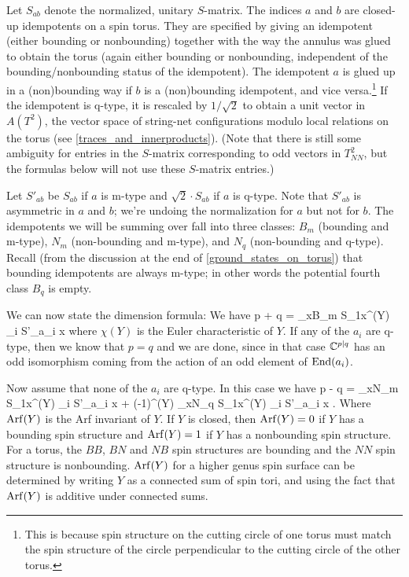 Let $S_{ab}$ denote the normalized, unitary $S$-matrix.
The indices $a$ and $b$ are closed-up idempotents on a spin torus.
They are specified by giving an idempotent (either bounding or nonbounding) together with
the way the annulus was glued 
to obtain the torus (again either bounding or nonbounding,
independent of the bounding/nonbounding status of the idempotent).
The idempotent $a$ is glued up in a (non)bounding way if $b$ is a (non)bounding idempotent, 
and vice versa.\footnote{
This is because spin structure on the cutting circle of one torus must
match the spin structure of the circle perpendicular to the cutting circle of the other torus.
}
If the idempotent is q-type, it is rescaled by $1/\sqrt 2$ to obtain a unit vector in $A(T^2)$, 
the vector space of string-net configurations modulo local relations on the torus
(see \ref{traces_and_innerproducts}).
(Note that there is still some ambiguity for entries in the $S$-matrix corresponding
to odd vectors in $T^2_{NN}$, but the formulas below will not use these $S$-matrix entries.)

Let $S'_{ab}$ be $S_{ab}$ if $a$ is m-type and $\sqrt 2 \cdot S_{ab}$ if $a$ is q-type.
Note that $S'_{ab}$ is asymmetric in $a$ and $b$;
we're undoing the normalization for $a$ but not for $b$.
The idempotents we will be summing over fall into three classes:
$B_m$ (bounding and m-type), $N_m$ (non-bounding and m-type), and $N_q$ (non-bounding and q-type).
Recall 
(from the discussion at the end of \ref{ground_states_on_torus}) 
that bounding idempotents are always m-type; in other words the potential fourth class $B_q$ is empty.


\medskip

We can now state the dimension formula:
We have
\be
	p + q = \sum_{x\in B_m} {S_{1x}}^{\chi(Y)} {\textstyle \prod_i} S'_{a_i x} 
	\label{PplusQ}
\ee
where $\chi(Y)$ is the Euler characteristic of $Y$.
If any of the $a_i$ are q-type, then we know that $p=q$ and we are done, since in that case 
$\mathbb{C}^{p|q}$ has an odd isomorphism coming from the action of an odd element of $\text{End}(a_i)$.

Now assume that none of the $a_i$ are q-type.
In this case we have
\be
	p - q = \sum_{x\in N_m} {S_{1x}}^{\chi(Y)} {\textstyle \prod_i} S'_{a_i x}
			\;\;+\;\; (-1)^{\Arf(Y)} \sum_{x\in N_q} {S_{1x}}^{\chi(Y)} {\textstyle \prod_i} S'_{a_i x} .
			\label{PminusQ}
\ee
Where $\operatorname{Arf}(Y)$ is the Arf invariant of $Y$.
If $Y$ is closed, then $\operatorname{Arf}(Y) = 0$ if $Y$ has a bounding spin structure and 
$\operatorname{Arf}(Y) = 1$ if $Y$ has a nonbounding spin structure.
For a torus, the $BB$, $BN$ and $NB$ spin structures are bounding and the $NN$ spin structure is nonbounding.
$\operatorname{Arf}(Y)$ for a higher genus spin surface can be determined by writing $Y$ as a connected sum of spin tori,
and using the fact that $\operatorname{Arf}(Y)$ is additive under connected sums.

